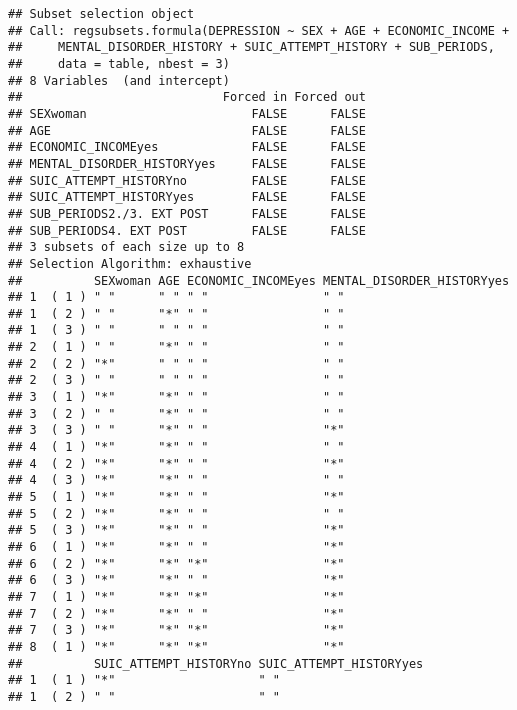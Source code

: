 \documentclass[
]{book}
\begin{document}
\begin{verbatim}
## Subset selection object
## Call: regsubsets.formula(DEPRESSION ~ SEX + AGE + ECONOMIC_INCOME + 
##     MENTAL_DISORDER_HISTORY + SUIC_ATTEMPT_HISTORY + SUB_PERIODS, 
##     data = table, nbest = 3)
## 8 Variables  (and intercept)
##                            Forced in Forced out
## SEXwoman                       FALSE      FALSE
## AGE                            FALSE      FALSE
## ECONOMIC_INCOMEyes             FALSE      FALSE
## MENTAL_DISORDER_HISTORYyes     FALSE      FALSE
## SUIC_ATTEMPT_HISTORYno         FALSE      FALSE
## SUIC_ATTEMPT_HISTORYyes        FALSE      FALSE
## SUB_PERIODS2./3. EXT POST      FALSE      FALSE
## SUB_PERIODS4. EXT POST         FALSE      FALSE
## 3 subsets of each size up to 8
## Selection Algorithm: exhaustive
##          SEXwoman AGE ECONOMIC_INCOMEyes MENTAL_DISORDER_HISTORYyes
## 1  ( 1 ) " "      " " " "                " "                       
## 1  ( 2 ) " "      "*" " "                " "                       
## 1  ( 3 ) " "      " " " "                " "                       
## 2  ( 1 ) " "      "*" " "                " "                       
## 2  ( 2 ) "*"      " " " "                " "                       
## 2  ( 3 ) " "      " " " "                " "                       
## 3  ( 1 ) "*"      "*" " "                " "                       
## 3  ( 2 ) " "      "*" " "                " "                       
## 3  ( 3 ) " "      "*" " "                "*"                       
## 4  ( 1 ) "*"      "*" " "                " "                       
## 4  ( 2 ) "*"      "*" " "                "*"                       
## 4  ( 3 ) "*"      "*" " "                " "                       
## 5  ( 1 ) "*"      "*" " "                "*"                       
## 5  ( 2 ) "*"      "*" " "                " "                       
## 5  ( 3 ) "*"      "*" " "                "*"                       
## 6  ( 1 ) "*"      "*" " "                "*"                       
## 6  ( 2 ) "*"      "*" "*"                "*"                       
## 6  ( 3 ) "*"      "*" " "                "*"                       
## 7  ( 1 ) "*"      "*" "*"                "*"                       
## 7  ( 2 ) "*"      "*" " "                "*"                       
## 7  ( 3 ) "*"      "*" "*"                "*"                       
## 8  ( 1 ) "*"      "*" "*"                "*"                       
##          SUIC_ATTEMPT_HISTORYno SUIC_ATTEMPT_HISTORYyes
## 1  ( 1 ) "*"                    " "                    
## 1  ( 2 ) " "                    " "                    

\end{verbatim}
\end{document}
